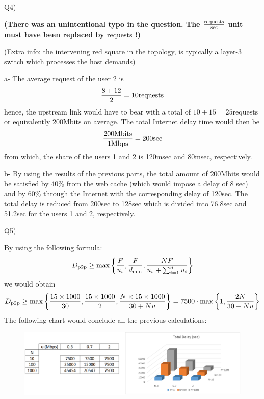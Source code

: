 \documentclass[10pt,letterpaper]{article}
\begin{document}
Q4)

\textbf{\color{red}(There was an unintentional typo in the question. The ${\text{requests}\over \text{sec}}$ unit must have been replaced by ${\text{requests}}$ !)}

(Extra info: the intervening red square in the topology, is typically a layer-3 switch which processes the host demands)

a- The average request of the user 2 is
$$
{8+12\over 2}=10 {\text{requests}}
$$
hence, the upstream link would have to bear with a total of $
10+15=25 {\text{requests}}
$ or equivalently $200\text{Mbits}$ on average. The total Internet delay time would then be $$
{200\text{Mbits}\over 1\text{Mbps}}=200\text{sec}
$$
from which, the share of the users 1 and 2 is 120msec and 80msec, respectively.

b- By using the results of the previous parts, the total amount of $200\text{Mbits}$ would be satisfied by 40\% from the web cache (which would impose a delay of 8 sec) and by 60\% through the Internet with the corresponding delay of 120sec. The total delay is reduced from 200sec to 128sec which is divided into 76.8sec and 51.2sec for the users 1 and 2, respectively.

Q5)

By using the following formula:
$$
D_\text{p2p}\ge \max\left\{{F\over u_s},{F\over d_\text{min}},{NF\over u_s+\sum_{i=1}^nu_i}\right\}
$$
we would obtain
$$
D_\text{p2p}\ge\max\left\{{15\times 1000\over 30},{15\times 1000\over 2},{N\times 15\times 1000\over 30+Nu}\right\}=7500\cdot\max\left\{1,{2N\over 30+Nu}\right\}
$$
The following chart would conclude all the previous calculations:
\begin{figure}[h!]
\centering
\includegraphics[width=170mm]{charthw2}
\end{figure}
%
\end{document}

